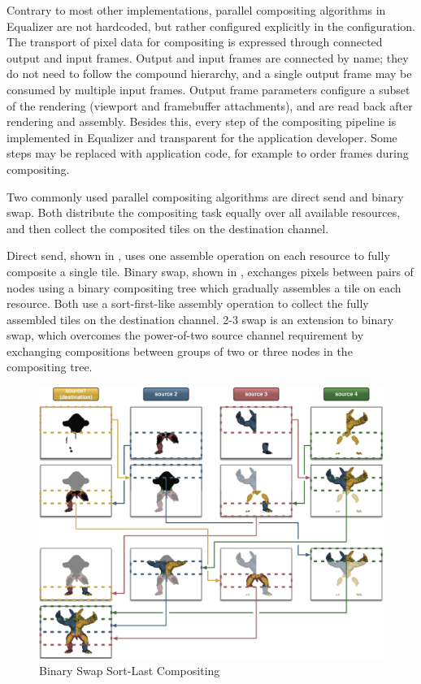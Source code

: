 Contrary to most other implementations, parallel compositing algorithms in
Equalizer are not hardcoded, but rather configured explicitly in the
configuration. The transport of pixel data for compositing is expressed through
connected output and input frames. Output and input frames are connected by
name; they do not need to follow the compound hierarchy, and a single output
frame may be consumed by multiple input frames. Output frame parameters
configure a subset of the rendering (viewport and framebuffer attachments), and
are read back after rendering and assembly. Besides this, every step of the
compositing pipeline is implemented in Equalizer and transparent for the
application developer. Some steps may be replaced with application code, for
example to order frames during compositing.

Two commonly used parallel compositing algorithms are direct send and binary
swap. Both distribute the compositing task equally over all available
resources, and then collect the composited tiles on the destination channel.

Direct send, shown in , uses one assemble operation on each
resource to fully composite a single tile. Binary swap, shown in ,
exchanges pixels between pairs of nodes using a binary compositing tree which
gradually assembles a tile on each resource. Both use a sort-first-like
assembly operation to collect the fully assembled tiles on the destination
channel. 2-3 swap \cite{Yu:2008:MPV:1413370.1413419} is an extension to binary
swap, which overcomes the power-of-two source channel requirement by exchanging
compositions between groups of two or three nodes in the compositing tree.

\begin{figure}[h!t]\center
 \includegraphics[width=\columnwidth]{images/binarySwap}
 {\caption{\label{fBS}Binary Swap Sort-Last Compositing}}
\end{figure}

